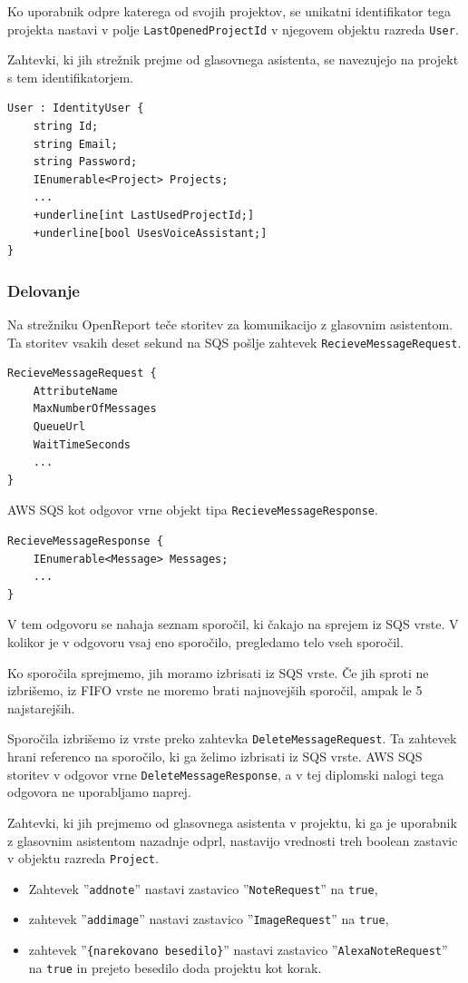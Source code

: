 \documentclass[a4paper, 12pt]{book}
\begin{document}
Ko uporabnik odpre katerega od svojih projektov, se unikatni identifikator tega projekta nastavi v polje \texttt{LastOpenedProjectId} v njegovem objektu razreda \texttt{User}.

Zahtevki, ki jih strežnik prejme od glasovnega asistenta, se navezujejo na projekt s tem identifikatorjem.

\begin{Verbatim}[commandchars=+\[\]]
User : IdentityUser {
    string Id; 
    string Email;
    string Password; 
    IEnumerable<Project> Projects;
    ... 
    +underline[int LastUsedProjectId;]
    +underline[bool UsesVoiceAssistant;]
}
\end{Verbatim}

\subsubsection{Delovanje}

Na strežniku OpenReport teče storitev za komunikacijo z glasovnim asistentom.
Ta storitev vsakih deset sekund na SQS pošlje zahtevek \texttt{RecieveMessageRequest}.

\begin{Verbatim}[commandchars=+\[\]]
RecieveMessageRequest {
    AttributeName 
    MaxNumberOfMessages 
    QueueUrl 
    WaitTimeSeconds
    ... 
} 
\end{Verbatim}

AWS SQS kot odgovor vrne objekt tipa \texttt{RecieveMessageResponse}.

\begin{Verbatim}[commandchars=+\[\]]
RecieveMessageResponse {
    IEnumerable<Message> Messages;
    ...
}
\end{Verbatim}

V tem odgovoru se nahaja seznam sporočil, ki čakajo na sprejem iz SQS vrste.
V kolikor je v odgovoru vsaj eno sporočilo, pregledamo telo vseh sporočil. 

Ko sporočila sprejmemo, jih moramo izbrisati iz SQS vrste.
Če jih sproti ne izbrišemo, iz FIFO vrste ne moremo brati najnovejših sporočil, ampak le 5 najstarejših.

Sporočila izbrišemo iz vrste preko zahtevka \texttt{DeleteMessageRequest}.
Ta zahtevek hrani referenco na sporočilo, ki ga želimo izbrisati iz SQS vrste.
AWS SQS storitev v odgovor vrne \texttt{DeleteMessageResponse}, a v tej diplomski nalogi tega odgovora ne uporabljamo naprej.

Zahtevki, ki jih prejmemo od glasovnega asistenta v projektu, ki ga je uporabnik z glasovnim asistentom nazadnje odprl, nastavijo vrednosti treh boolean zastavic v objektu razreda \texttt{Project}.
\begin{itemize}
	\item Zahtevek ''\texttt{addnote}'' nastavi zastavico ''\texttt{NoteRequest}'' na \texttt{true},
	\item zahtevek ''\texttt{addimage}'' nastavi zastavico ''\texttt{ImageRequest}'' na \texttt{true},
	\item zahtevek ''\texttt{\{narekovano besedilo\}}'' nastavi zastavico ''\texttt{AlexaNoteRequest}'' na \texttt{true} in prejeto besedilo doda projektu kot korak.
\end{itemize}
\end{document}
